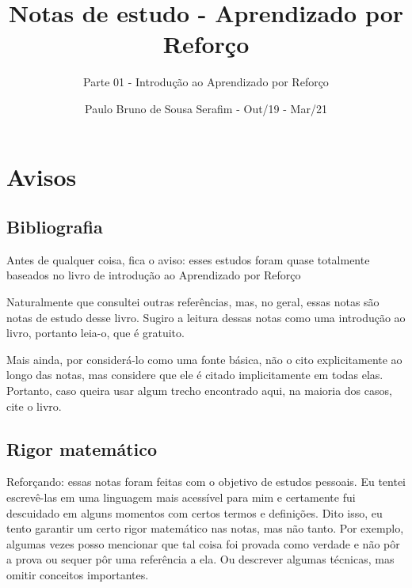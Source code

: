 \documentclass{article}
\title{Notas de estudo - Aprendizado por Reforço}
\author{Parte 01 - Introdução ao Aprendizado por Reforço}
\date{Paulo Bruno de Sousa Serafim - Out/19 - Mar/21}
\begin{document}
\maketitle

    \section{Avisos}
    
        \subsection{Bibliografia}
        
            Antes de qualquer coisa, fica o aviso: esses estudos foram quase totalmente baseados no livro de introdução ao Aprendizado por Reforço
        
            \begin{center}
            \noindent{}%
            \end{center}
            
            Naturalmente que consultei outras referências, mas, no geral, essas notas são notas de estudo desse livro. Sugiro a leitura dessas notas como uma introdução ao livro, portanto leia-o, que é gratuito.
            
            Mais ainda, por considerá-lo como uma fonte básica, não o cito explicitamente ao longo das notas, mas considere que ele é citado implicitamente em todas elas. Portanto, caso queira usar algum trecho encontrado aqui, na maioria dos casos, cite o livro.
            
        \subsection{Rigor matemático}
        
            Reforçando: essas notas foram feitas com o objetivo de estudos pessoais. Eu tentei escrevê-las em uma linguagem mais acessível para mim e certamente fui descuidado em alguns momentos com certos termos e definições. Dito isso, eu tento garantir um certo rigor matemático nas notas, mas não tanto. Por exemplo, algumas vezes posso mencionar que tal coisa foi provada como verdade e não pôr a prova ou sequer pôr uma referência a ela. Ou descrever algumas técnicas, mas omitir conceitos importantes.
            
\end{document}
